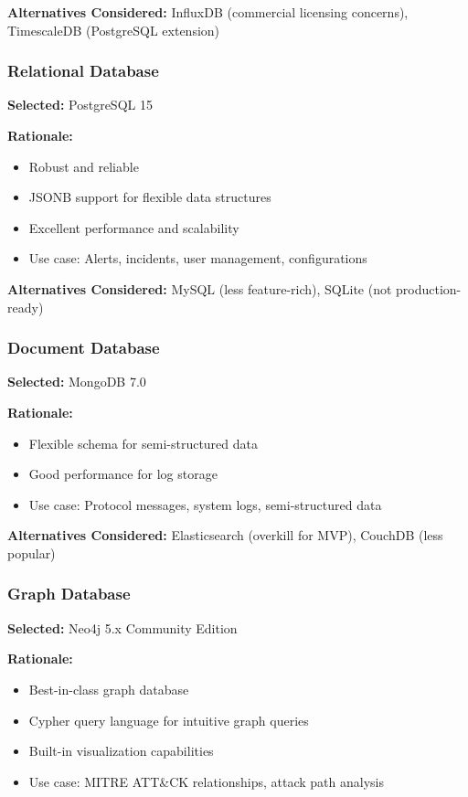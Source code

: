 \documentclass[12pt,a4paper]{article}
\begin{document}
\textbf{Alternatives Considered:} InfluxDB (commercial licensing concerns), TimescaleDB (PostgreSQL extension)

\subsubsection{Relational Database}

\textbf{Selected:} PostgreSQL 15

\textbf{Rationale:}
\begin{itemize}[leftmargin=1cm,itemsep=0pt]
    \item Robust and reliable
    \item JSONB support for flexible data structures
    \item Excellent performance and scalability
    \item Use case: Alerts, incidents, user management, configurations
\end{itemize}

\textbf{Alternatives Considered:} MySQL (less feature-rich), SQLite (not production-ready)

\subsubsection{Document Database}

\textbf{Selected:} MongoDB 7.0

\textbf{Rationale:}
\begin{itemize}[leftmargin=1cm,itemsep=0pt]
    \item Flexible schema for semi-structured data
    \item Good performance for log storage
    \item Use case: Protocol messages, system logs, semi-structured data
\end{itemize}

\textbf{Alternatives Considered:} Elasticsearch (overkill for MVP), CouchDB (less popular)

\subsubsection{Graph Database}

\textbf{Selected:} Neo4j 5.x Community Edition

\textbf{Rationale:}
\begin{itemize}[leftmargin=1cm,itemsep=0pt]
    \item Best-in-class graph database
    \item Cypher query language for intuitive graph queries
    \item Built-in visualization capabilities
    \item Use case: MITRE ATT\&CK relationships, attack path analysis
\end{itemize}
\end{document}
